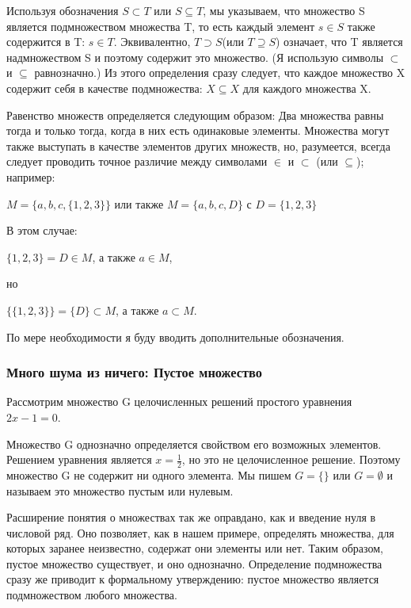 Используя обозначения \(S \subset T\) или \(S \subseteq T\), мы указываем, что множество S является подмножеством множества T, то есть каждый элемент \(s \in S\) также содержится в T: \(s \in T\). Эквивалентно, \(T \supset S\)(или \(T \supseteq S\)) означает, что T является надмножеством S и поэтому содержит это множество. (Я использую символы \(\subset\) и \(\subseteq\) равнозначно.) Из этого определения сразу следует, что каждое множество X содержит себя в качестве подмножества: \(X \subseteq X\) для каждого множества X.

Равенство множеств определяется следующим образом: Два множества равны тогда и только тогда, когда в них есть одинаковые элементы. Множества могут также выступать в качестве элементов других множеств, но, разумеется, всегда следует проводить точное различие между символами \(\in\) и \(\subset\) (или \(\subseteq\)); например:

\vspace{0.5cm}
\(M = \{a,b,c,\{1,2,3\}\}\) или также \(M = \{a,b,c,D\}\) с \(D=\{1,2,3\}\)
\vspace{0.5cm}

В этом случае:

\vspace{0.5cm}
\(\{1,2,3\}=D \in M\), а также \(a \in M\),

но

\(\{\{1,2,3\}\}=\{D\} \subset M\), а также \(a \subset M\).
\vspace{0.5cm}

По мере необходимости я буду вводить дополнительные обозначения.

\subsubsection{Много шума из ничего: Пустое множество}
Рассмотрим множество G целочисленных решений простого уравнения \(2x-1=0\).

Множество G однозначно определяется свойством его возможных элементов.
Решением уравнения является \(x=\frac{1}{2}\), но это не целочисленное решение.
Поэтому множество G не содержит ни одного элемента. Мы пишем \(G=\{\}\) или \(G=\emptyset\) и называем это множество пустым или нулевым.

Расширение понятия о множествах так же оправдано, как и введение нуля в числовой ряд.
Оно позволяет, как в нашем примере, определять множества, для которых заранее неизвестно, содержат они элементы или нет.
Таким образом, пустое множество существует, и оно однозначно.
Определение подмножества сразу же приводит к формальному утверждению: пустое множество является подмножеством любого множества.

